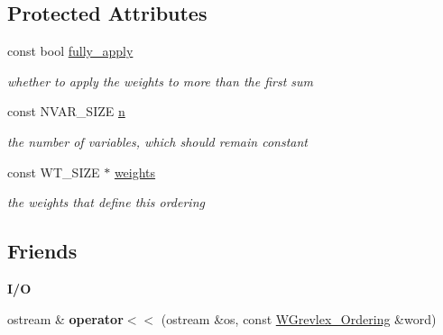 \subsection*{Protected Attributes}
\begin{DoxyCompactItemize}
\item 
const bool \hyperlink{class_w_grevlex___ordering_a52802c4f2a420fb4aa3faea99a0e4a5f}{fully\+\_\+apply}\hypertarget{class_w_grevlex___ordering_a52802c4f2a420fb4aa3faea99a0e4a5f}{}\label{class_w_grevlex___ordering_a52802c4f2a420fb4aa3faea99a0e4a5f}

\begin{DoxyCompactList}\small\item\em whether to apply the weights to more than the first sum \end{DoxyCompactList}\item 
const N\+V\+A\+R\+\_\+\+S\+I\+ZE \hyperlink{class_w_grevlex___ordering_aac717e12743a303333944dddc14186de}{n}\hypertarget{class_w_grevlex___ordering_aac717e12743a303333944dddc14186de}{}\label{class_w_grevlex___ordering_aac717e12743a303333944dddc14186de}

\begin{DoxyCompactList}\small\item\em the number of variables, which should remain constant \end{DoxyCompactList}\item 
const W\+T\+\_\+\+S\+I\+ZE $\ast$ \hyperlink{class_w_grevlex___ordering_a2add73071d98b93016f37c22cccfe65b}{weights}\hypertarget{class_w_grevlex___ordering_a2add73071d98b93016f37c22cccfe65b}{}\label{class_w_grevlex___ordering_a2add73071d98b93016f37c22cccfe65b}

\begin{DoxyCompactList}\small\item\em the weights that define this ordering \end{DoxyCompactList}\end{DoxyCompactItemize}
\subsection*{Friends}
\begin{Indent}{\bf I/O}\par
\begin{DoxyCompactItemize}
\item 
ostream \& {\bfseries operator$<$$<$} (ostream \&os, const \hyperlink{class_w_grevlex___ordering}{W\+Grevlex\+\_\+\+Ordering} \&word)\hypertarget{class_w_grevlex___ordering_a6cc466f6e4ccdfe494bc56f06d7e97ff}{}\label{class_w_grevlex___ordering_a6cc466f6e4ccdfe494bc56f06d7e97ff}

\end{DoxyCompactItemize}
\end{Indent}


